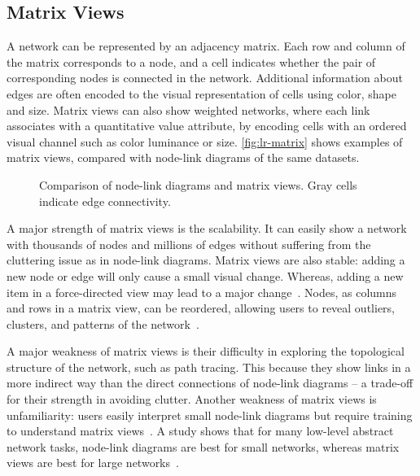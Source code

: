 \subsection{Matrix Views}
A network can be represented by an adjacency matrix. Each row and column of the matrix corresponds to a node, and a cell indicates whether the pair of corresponding nodes is connected in the network. Additional information about edges are often encoded to the visual representation of cells using color, shape and size. Matrix views can also show weighted networks, where each link associates with a quantitative value attribute, by encoding cells with an ordered visual channel such as color luminance or size. \autoref{fig:lr-matrix} shows examples of matrix views, compared with node-link diagrams of the same datasets.

\begin{figure}[!htb]
\centering
{}
\hfill
{}
\hfill
{}
\caption[Comparison of node-link diagrams and matrix views]{Comparison of node-link diagrams and matrix views. Gray cells indicate edge connectivity. }
\label{fig:lr-matrix}
\end{figure}

A major strength of matrix views is the scalability. It can easily show a network with thousands of nodes and millions of edges without suffering from the cluttering issue as in node-link diagrams. Matrix views are also stable: adding a new node or edge will only cause a small visual change. Whereas, adding a new item in a force-directed view may lead to a major change~\cite{Munzner2014}. Nodes, as columns and rows in a matrix view, can be reordered, allowing users to reveal outliers, clusters, and patterns of the network~\cite{Henry2007}.

A major weakness of matrix views is their difficulty in exploring the topological structure of the network, such as path tracing. This because they show links in a more indirect way than the direct connections of node-link diagrams -- a trade-off for their strength in avoiding clutter. Another weakness of matrix views is unfamiliarity: users easily interpret small node-link diagrams but require training to understand matrix views~\cite{Munzner2014}. A study shows that for many low-level abstract network tasks, node-link diagrams are best for small networks, whereas matrix views are best for large networks~\cite{Ghoniem2005}.

